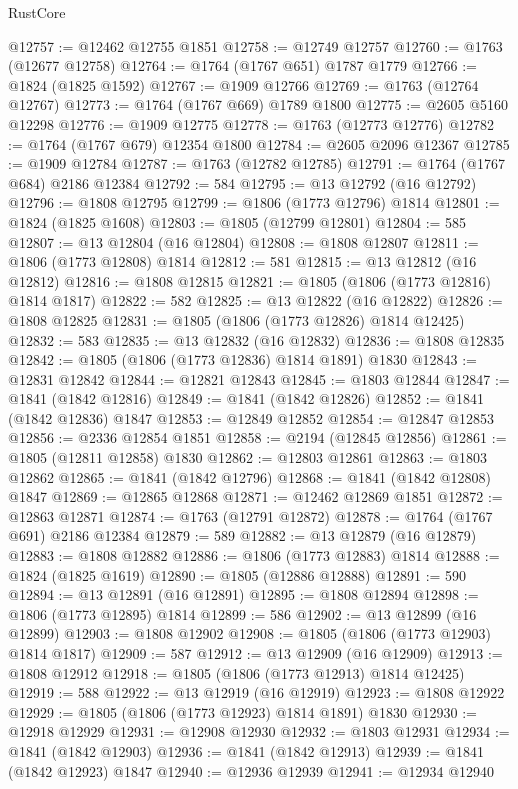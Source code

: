 \begin{lexlean}{RustCore}
\begin{coremodule}
@12757 := @12462 @12755 @1851
@12758 := @12749 @12757
@12760 := @1763 (@12677 @12758)
@12764 := @1764 (@1767 @651) @1787 @1779
@12766 := @1824 (@1825 @1592)
@12767 := @1909 @12766
@12769 := @1763 (@12764 @12767)
@12773 := @1764 (@1767 @669) @1789 @1800
@12775 := @2605 @5160 @12298
@12776 := @1909 @12775
@12778 := @1763 (@12773 @12776)
@12782 := @1764 (@1767 @679) @12354 @1800
@12784 := @2605 @2096 @12367
@12785 := @1909 @12784
@12787 := @1763 (@12782 @12785)
@12791 := @1764 (@1767 @684) @2186 @12384
@12792 := 584
@12795 := @13 @12792 (@16 @12792)
@12796 := @1808 @12795
@12799 := @1806 (@1773 @12796) @1814
@12801 := @1824 (@1825 @1608)
@12803 := @1805 (@12799 @12801)
@12804 := 585
@12807 := @13 @12804 (@16 @12804)
@12808 := @1808 @12807
@12811 := @1806 (@1773 @12808) @1814
@12812 := 581
@12815 := @13 @12812 (@16 @12812)
@12816 := @1808 @12815
@12821 := @1805 (@1806 (@1773 @12816) @1814 @1817)
@12822 := 582
@12825 := @13 @12822 (@16 @12822)
@12826 := @1808 @12825
@12831 := @1805 (@1806 (@1773 @12826) @1814 @12425)
@12832 := 583
@12835 := @13 @12832 (@16 @12832)
@12836 := @1808 @12835
@12842 := @1805 (@1806 (@1773 @12836) @1814 @1891) @1830
@12843 := @12831 @12842
@12844 := @12821 @12843
@12845 := @1803 @12844
@12847 := @1841 (@1842 @12816)
@12849 := @1841 (@1842 @12826)
@12852 := @1841 (@1842 @12836) @1847
@12853 := @12849 @12852
@12854 := @12847 @12853
@12856 := @2336 @12854 @1851
@12858 := @2194 (@12845 @12856)
@12861 := @1805 (@12811 @12858) @1830
@12862 := @12803 @12861
@12863 := @1803 @12862
@12865 := @1841 (@1842 @12796)
@12868 := @1841 (@1842 @12808) @1847
@12869 := @12865 @12868
@12871 := @12462 @12869 @1851
@12872 := @12863 @12871
@12874 := @1763 (@12791 @12872)
@12878 := @1764 (@1767 @691) @2186 @12384
@12879 := 589
@12882 := @13 @12879 (@16 @12879)
@12883 := @1808 @12882
@12886 := @1806 (@1773 @12883) @1814
@12888 := @1824 (@1825 @1619)
@12890 := @1805 (@12886 @12888)
@12891 := 590
@12894 := @13 @12891 (@16 @12891)
@12895 := @1808 @12894
@12898 := @1806 (@1773 @12895) @1814
@12899 := 586
@12902 := @13 @12899 (@16 @12899)
@12903 := @1808 @12902
@12908 := @1805 (@1806 (@1773 @12903) @1814 @1817)
@12909 := 587
@12912 := @13 @12909 (@16 @12909)
@12913 := @1808 @12912
@12918 := @1805 (@1806 (@1773 @12913) @1814 @12425)
@12919 := 588
@12922 := @13 @12919 (@16 @12919)
@12923 := @1808 @12922
@12929 := @1805 (@1806 (@1773 @12923) @1814 @1891) @1830
@12930 := @12918 @12929
@12931 := @12908 @12930
@12932 := @1803 @12931
@12934 := @1841 (@1842 @12903)
@12936 := @1841 (@1842 @12913)
@12939 := @1841 (@1842 @12923) @1847
@12940 := @12936 @12939
@12941 := @12934 @12940

\end{coremodule}
\end{lexlean}
